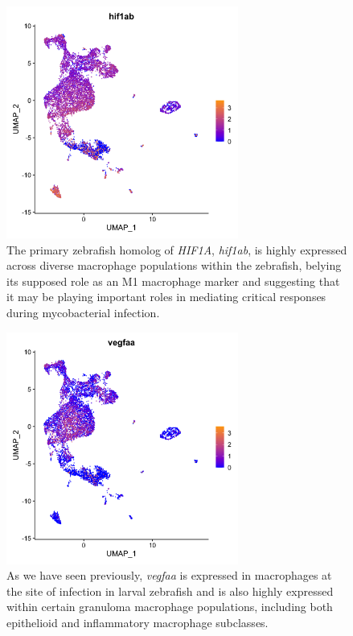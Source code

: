 \begin{figure}
\centering
\includegraphics[height=3in]{images/wtCombo_hif1ab_GEPlot.png}
\caption[scRNA\hyp{}seq expression data for \textit{hif1ab}]{The primary zebrafish homolog of \textit{HIF1A}, \textit{hif1ab}, is highly expressed across diverse macrophage populations within the zebrafish, belying its supposed role as an M1 macrophage marker and suggesting that it may be playing important roles in mediating critical responses during mycobacterial infection.}
\label{figure:schif1ab}
\end{figure}

\begin{figure}
\centering
\includegraphics[height=3in]{images/wtCombo_vegfaa_GEPlot.png}
\caption[scRNA\hyp{}seq expression data for \textit{vegfaa}]{As we have seen previously, \textit{vegfaa} is expressed in macrophages at the site of infection in larval zebrafish and is also highly expressed within certain granuloma macrophage populations, including both epithelioid and inflammatory macrophage subclasses.}
\label{figure:scvegfaa}
\end{figure}

